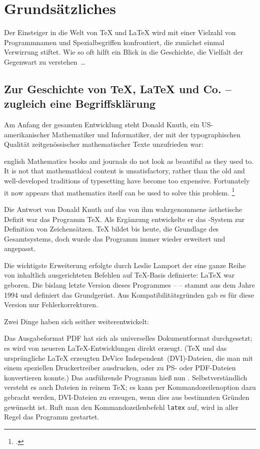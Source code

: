 \chapter{Grundsätzliches}

Der Einsteiger in die Welt von \TeX{} und \LaTeX{} wird mit einer Vielzahl von Programmnamen und 
Spezialbegriffen konfrontiert, die zunächst einmal Verwirrung stiftet.
Wie so oft hilft ein Blick in die Geschichte, die Vielfalt der Gegenwart zu verstehen~\dots


\section{Zur Geschichte von \TeX{}, \LaTeX{} und Co. -- zugleich eine Begriffsklärung}

Am Anfang der gesamten Entwicklung steht Donald Knuth, ein US-amerikanischer Mathematiker und 
Informatiker, der mit der typographischen Qualität zeitgenössischer mathematischer Texte 
unzufrieden war:

\begin{foreigndisplayquote}{english}
 Mathematics books and journals do not look as beautiful as they used to.
 It is not that mathemathical content is unsatisfactory, rather than the old and 
 well-developed traditions of typesetting have become too expensive.
 Fortunately it now appears that mathematics itself can be used to solve this problem.%
 \footcite[Zitiert nach:][1]{voss:einfuehrung}
\end{foreigndisplayquote}

Die Antwort von Donald Knuth auf das von ihm wahrgenommene ästhetische Defizit war das  
Programm \TeX. Als Ergänzung entwickelte er das \METAFONT-System zur Definition von 
Zeichensätzen.
\TeX{} bildet bis heute, die Grundlage des Gesamtsystems, doch wurde das Programm immer 
wieder erweitert und angepasst.

Die wichtigste Erweiterung erfolgte durch Leslie Lamport der eine ganze Reihe von 
inhaltlich ausgerichteten Befehlen auf \TeX-Basis definierte: \LaTeX{} war geboren.
Die bislang letzte Version dieses Programmes -- \LaTeXe{} -- stammt aus dem Jahre 1994
und definiert das Grundgerüst. Aus Kompatibilitätsgründen gab es für diese Version nur
Fehlerkorrekturen.

Zwei Dinge haben sich seither weiterentwickelt:

Das Ausgabeformat PDF hat sich als universelles Dokumentformat durchgesetzt; es wird von neueren
\LaTeX-Entwicklungen direkt erzeugt. (\TeX{} und das ursprüngliche \LaTeX{} erzeugten DeVice 
Independent~(DVI)-Dateien, die man mit einem speziellen Druckertreiber ausdrucken,
oder zu PS- oder PDF-Dateien konvertieren konnte.)
Das ausführende Programm hieß nun \pdfLaTeX. 
Selbstverständlich versteht es auch Dateien in reinem \TeX{};
es kann per Kommandozeilenoption dazu gebracht werden, DVI-Dateien zu erzeugen, wenn dies aus 
bestimmten Gründen gewünscht ist.
Ruft man den Kommandozeilenbefehl \lstinline/latex/ auf, wird in aller Regel das Programm 
\pdfLaTeX{} gestartet.

